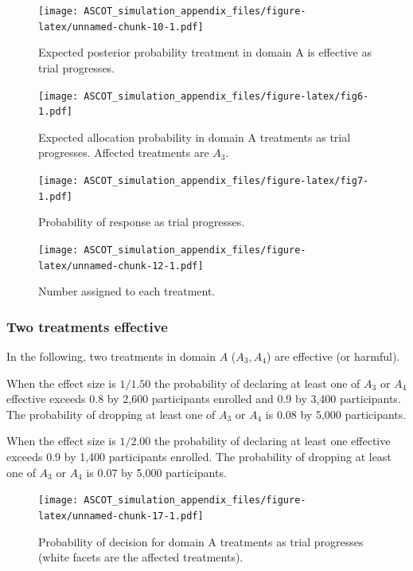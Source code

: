 \documentclass[
]{article}
\begin{document}
\begin{figure}
\centering
\texttt{[image: ASCOT\_simulation\_appendix\_files/figure-latex/unnamed-chunk-10-1.pdf]}
\caption{\label{fig:unnamed-chunk-10}Expected posterior probability treatment in domain A is effective as trial progresses.}
\end{figure}

\begin{figure}
\centering
\texttt{[image: ASCOT\_simulation\_appendix\_files/figure-latex/fig6-1.pdf]}
\caption{\label{fig:fig6}Expected allocation probability in domain A treatments as trial progresses. Affected treatments are \(A_3\).}
\end{figure}

\begin{figure}
\centering
\texttt{[image: ASCOT\_simulation\_appendix\_files/figure-latex/fig7-1.pdf]}
\caption{\label{fig:fig7}Probability of response as trial progresses.}
\end{figure}

\begin{figure}
\centering
\texttt{[image: ASCOT\_simulation\_appendix\_files/figure-latex/unnamed-chunk-12-1.pdf]}
\caption{\label{fig:unnamed-chunk-12}Number assigned to each treatment.}
\end{figure}

\clearpage

\hypertarget{two-treatments-effective}{%
\subsubsection{Two treatments effective}\label{two-treatments-effective}}

In the following, two treatments in domain \(A\) (\(A_3, A_4\)) are effective (or harmful).

When the effect size is \(1/1.50\) the probability of declaring at least one of \(A_3\) or \(A_4\) effective exceeds 0.8 by 2,600 participants enrolled and 0.9 by 3,400 participants.
The probability of dropping at least one of \(A_3\) or \(A_4\) is 0.08 by 5,000 participants.

When the effect size is \(1/2.00\) the probability of declaring at least one effective exceeds 0.9 by 1,400 participants enrolled.
The probability of dropping at least one of \(A_3\) or \(A_4\) is 0.07 by 5,000 participants.

\begin{figure}
\centering
\texttt{[image: ASCOT\_simulation\_appendix\_files/figure-latex/unnamed-chunk-17-1.pdf]}
\caption{\label{fig:unnamed-chunk-17}Probability of decision for domain A treatments as trial progresses (white facets are the affected treatments).}
\end{figure}
\end{document}
